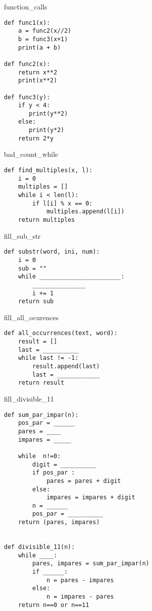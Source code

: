 \begin{chunk}{function_calls}
\begin{lstlisting}
def func1(x):
    a = func2(x//2)
    b = func3(x+1)
    print(a + b)

def func2(x):
    return x**2
    print(x**2)

def func3(y):
    if y < 4:
       print(y**2)
    else:
       print(y*2)
    return 2*y
\end{lstlisting}
\end{chunk}

\begin{chunk}{bad_count_while}
\begin{lstlisting}
def find_multiples(x, l):
    i = 0
    multiples = []
    while i < len(l):
        if l[i] % x == 0:
            multiples.append(l[i])
    return multiples
\end{lstlisting}
\end{chunk}

\begin{chunk}{fill_sub_str}
\begin{lstlisting}
def substr(word, ini, num):
    i = 0
    sub = ""
    while _______________________:
        _______________
        i += 1
    return sub
\end{lstlisting}
\end{chunk}

\begin{chunk}{fill_all_ocurences}
\begin{lstlisting}
def all_occurrences(text, word):
    result = []
    last = __________
    while last != -1:
        result.append(last)
        last = ____________
    return result
\end{lstlisting}
\end{chunk}

\begin{chunk}{fill_divisible_11}
\begin{lstlisting}
def sum_par_impar(n):
    pos_par = ______
    pares = ____
    impares = _____

    while  n!=0:
        digit = __________
        if pos_par :
            pares = pares + digit
        else:
            impares = impares + digit
        n = ______
        pos_par = __________
    return (pares, impares)


def divisible_11(n):
    while ____:
        pares, impares = sum_par_impar(n)
        if ______:
            n = pares - impares
        else:
            n = impares - pares
    return n==0 or n==11
\end{lstlisting}
\end{chunk}

